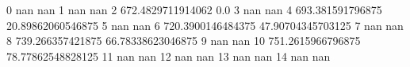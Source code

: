 0 nan nan
1 nan nan
2 672.4829711914062 0.0
3 nan nan
4 693.381591796875 20.89862060546875
5 nan nan
6 720.3900146484375 47.90704345703125
7 nan nan
8 739.266357421875 66.78338623046875
9 nan nan
10 751.2615966796875 78.77862548828125
11 nan nan
12 nan nan
13 nan nan
14 nan nan

